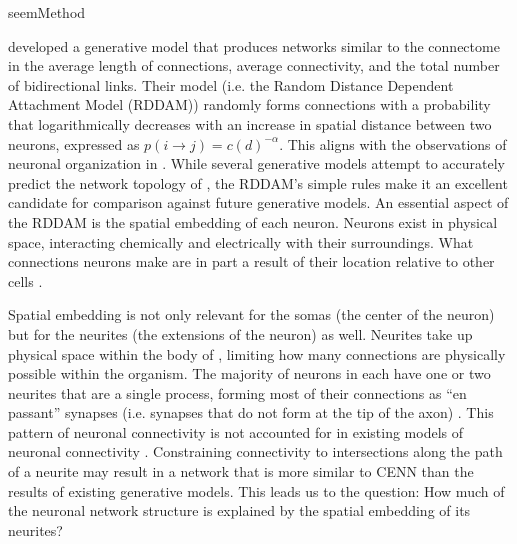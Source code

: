 {seemMethod}

\cite{Itzhack} developed a generative model that produces networks similar to the \ce connectome in the average length of connections, average connectivity, and the total number of bidirectional links. 
Their model (i.e. the Random Distance Dependent Attachment Model (RDDAM)) randomly forms connections with a probability that logarithmically decreases with an increase in spatial distance between two neurons, expressed as $p(i \rightarrow j)= c(d)^{-\alpha}$.
This aligns with the observations of neuronal organization in \ce \citep{PerezEscudero}.
While several generative models attempt to accurately predict the network topology of \ce \citep{Costa, Khajezade, Nicosia}, the RDDAM’s simple rules make it an excellent candidate for comparison against future generative models.
An essential aspect of the RDDAM is the spatial embedding of each neuron. 
Neurons exist in physical space, interacting chemically and electrically with their surroundings. 
What connections neurons make are in part a result of their location relative to other cells \citep{Hentschel, Kaiser, PerezEscudero}.

Spatial embedding is not only relevant for the somas (the center of the neuron) but for the neurites (the extensions of the neuron) as well. 
Neurites take up physical space within the body of \ce, limiting how many connections are physically possible within the organism. 
The majority of neurons in \ce each have one or two neurites that are a single process, forming most of their connections as “en passant” synapses (i.e. synapses that do not form at the tip of the axon) \citep{Durbin, White}. 
This pattern of neuronal connectivity is not accounted for in existing models of \ce neuronal connectivity \citep{Costa, Itzhack, Khajezade, Nicosia}. 
Constraining connectivity to intersections along the path of a neurite may result in a network that is more similar to CENN than the results of existing generative models. 
This leads us to the question: How much of the \ce neuronal network structure is explained by the spatial embedding of its neurites?